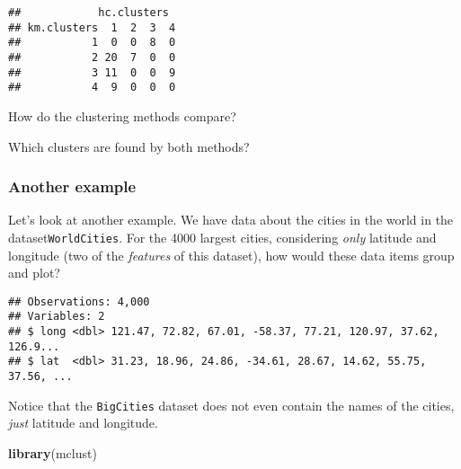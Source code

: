 \documentclass[]{article}
\newenvironment{Shaded}{\begin{snugshade}}{\end{snugshade}}
\newcommand{\KeywordTok}[1]{\textcolor[rgb]{0.13,0.29,0.53}{\textbf{#1}}}
\newcommand{\DecValTok}[1]{\textcolor[rgb]{0.00,0.00,0.81}{#1}}
\newcommand{\StringTok}[1]{\textcolor[rgb]{0.31,0.60,0.02}{#1}}
\newcommand{\CommentTok}[1]{\textcolor[rgb]{0.56,0.35,0.01}{\textit{#1}}}
\newcommand{\OperatorTok}[1]{\textcolor[rgb]{0.81,0.36,0.00}{\textbf{#1}}}
\newcommand{\NormalTok}[1]{#1}
\begin{document}
\begin{verbatim}
##            hc.clusters
## km.clusters  1  2  3  4
##           1  0  0  8  0
##           2 20  7  0  0
##           3 11  0  0  9
##           4  9  0  0  0
\end{verbatim}

How do the clustering methods compare?

Which clusters are found by both methods?

\subsubsection{Another example}\label{another-example}

Let's look at another example. We have data about the cities in the
world in the dataset\texttt{WorldCities}. For the 4000 largest cities,
considering \emph{only} latitude and longitude (two of the
\emph{features} of this dataset), how would these data items group and
plot?

\begin{Shaded}
\end{Shaded}

\begin{verbatim}
## Observations: 4,000
## Variables: 2
## $ long <dbl> 121.47, 72.82, 67.01, -58.37, 77.21, 120.97, 37.62, 126.9...
## $ lat  <dbl> 31.23, 18.96, 24.86, -34.61, 28.67, 14.62, 55.75, 37.56, ...
\end{verbatim}

Notice that the \texttt{BigCities} dataset does not even contain the
names of the cities, \emph{just} latitude and longitude.

\begin{Shaded}
\begin{Highlighting}[]
\KeywordTok{library}\NormalTok{(mclust)}
\end{Highlighting}
\end{Shaded}
\end{document}
